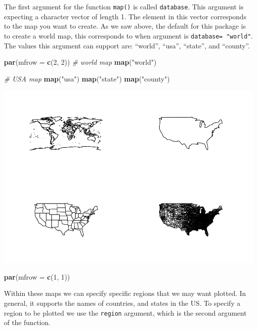 \documentclass[
]{book}
\newenvironment{Shaded}{\begin{snugshade}}{\end{snugshade}}
\newcommand{\CommentTok}[1]{\textcolor[rgb]{0.56,0.35,0.01}{\textit{#1}}}
\newcommand{\DataTypeTok}[1]{\textcolor[rgb]{0.13,0.29,0.53}{#1}}
\newcommand{\DecValTok}[1]{\textcolor[rgb]{0.00,0.00,0.81}{#1}}
\newcommand{\KeywordTok}[1]{\textcolor[rgb]{0.13,0.29,0.53}{\textbf{#1}}}
\newcommand{\NormalTok}[1]{#1}
\newcommand{\StringTok}[1]{\textcolor[rgb]{0.31,0.60,0.02}{#1}}
\begin{document}
The first argument for the function \texttt{map()} is called \texttt{database}. This argument is expecting a character vector of length 1. The element in this vector corresponds to the map you want to create. As we saw above, the default for this package is to create a world map, this corresponds to when argument is \texttt{database=\ "world"}. The values this argument can support are: ``world'', ``usa'', ``state'', and ``county''.

\begin{Shaded}
\begin{Highlighting}[]
\KeywordTok{par}\NormalTok{(}\DataTypeTok{mfrow =} \KeywordTok{c}\NormalTok{(}\DecValTok{2}\NormalTok{, }\DecValTok{2}\NormalTok{))}
\CommentTok{# world map}
\KeywordTok{map}\NormalTok{(}\StringTok{"world"}\NormalTok{)}

\CommentTok{# USA map}
\KeywordTok{map}\NormalTok{(}\StringTok{"usa"}\NormalTok{)}
\KeywordTok{map}\NormalTok{(}\StringTok{"state"}\NormalTok{)}
\KeywordTok{map}\NormalTok{(}\StringTok{"county"}\NormalTok{)}
\end{Highlighting}
\end{Shaded}

\includegraphics{_main_files/figure-latex/unnamed-chunk-195-1.pdf}

\begin{Shaded}
\begin{Highlighting}[]
\KeywordTok{par}\NormalTok{(}\DataTypeTok{mfrow =} \KeywordTok{c}\NormalTok{(}\DecValTok{1}\NormalTok{, }\DecValTok{1}\NormalTok{))}
\end{Highlighting}
\end{Shaded}

Within these maps we can specify specific regions that we may want plotted. In general, it supports the names of countries, and states in the US. To specify a region to be plotted we use the \texttt{region} argument, which is the second argument of the function.
\end{document}
